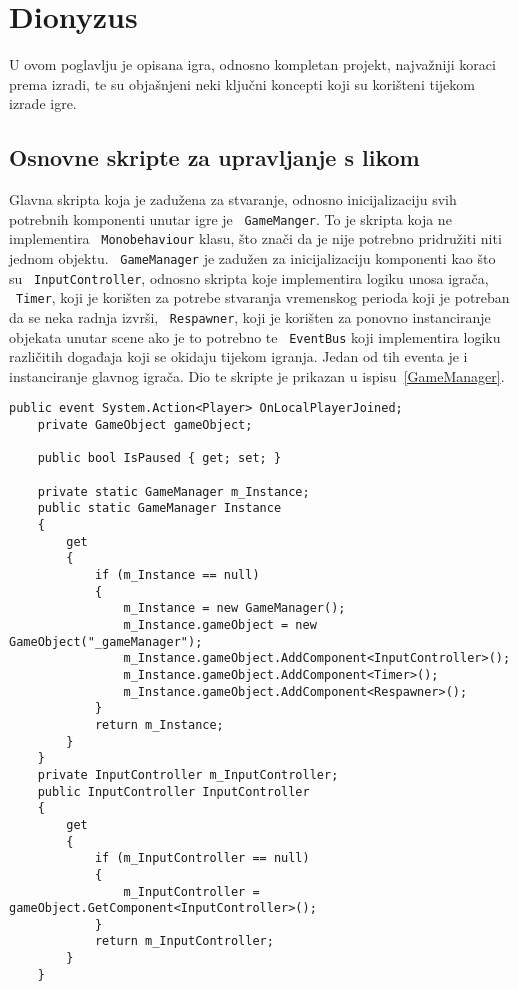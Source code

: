 \section{Dionyzus}
U ovom poglavlju je opisana igra, odnosno kompletan projekt, najvažniji koraci prema
izradi, te su objašnjeni neki ključni koncepti koji su korišteni tijekom izrade
igre.
\subsection{Osnovne skripte za upravljanje s likom}
Glavna skripta koja je zadužena za stvaranje, odnosno inicijalizaciju svih potrebnih
komponenti unutar igre je ~\texttt{GameManger}. To je skripta koja ne implementira
~\texttt{Monobehaviour} klasu, što znači da je nije potrebno pridružiti niti jednom objektu.
~\texttt{GameManager} je zadužen za inicijalizaciju komponenti kao što su ~\texttt{InputController},
odnosno skripta koje implementira logiku unosa igrača, ~\texttt{Timer}, koji je korišten za
potrebe stvaranja vremenskog perioda koji je potreban da se neka radnja izvrši,
~\texttt{Respawner}, koji je korišten za ponovno instanciranje objekata unutar scene ako je to
potrebno te ~\texttt{EventBus} koji implementira logiku različitih događaja koji se okidaju
tijekom igranja. Jedan od tih eventa je i instanciranje glavnog igrača.
Dio te skripte je prikazan u ispisu~\ref{GameManager}.
\begin{lstlisting}[caption={Menadžer igre}, label=GameManager]
    public event System.Action<Player> OnLocalPlayerJoined;
    private GameObject gameObject;

    public bool IsPaused { get; set; }

    private static GameManager m_Instance;
    public static GameManager Instance
    {
        get
        {
            if (m_Instance == null)
            {
                m_Instance = new GameManager();
                m_Instance.gameObject = new GameObject("_gameManager");
                m_Instance.gameObject.AddComponent<InputController>();
                m_Instance.gameObject.AddComponent<Timer>();
                m_Instance.gameObject.AddComponent<Respawner>();
            }
            return m_Instance;
        }
    }
    private InputController m_InputController;
    public InputController InputController
    {
        get
        {
            if (m_InputController == null)
            {
                m_InputController = gameObject.GetComponent<InputController>();
            }
            return m_InputController;
        }
    }
\end{lstlisting}

